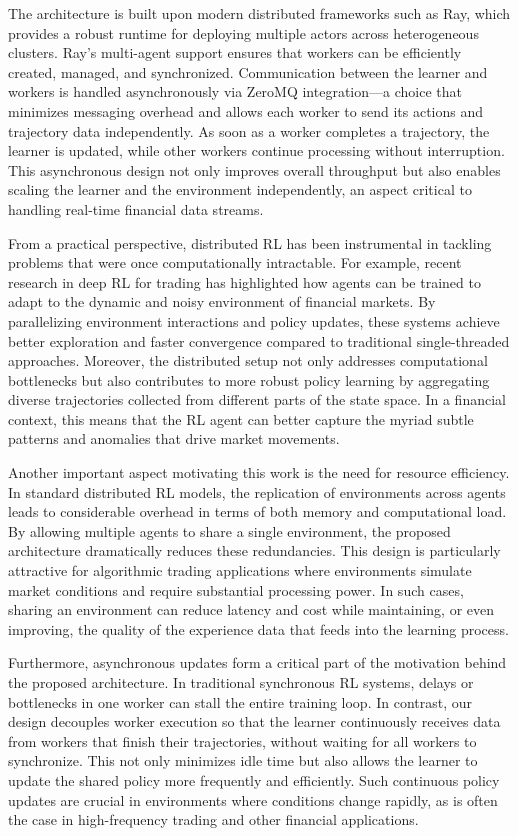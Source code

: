 The architecture is built upon modern distributed frameworks such as Ray, which provides a robust runtime
for deploying multiple actors across heterogeneous clusters.
Ray’s multi-agent support ensures that workers can be efficiently created, managed, and synchronized.
Communication between the learner and workers is handled asynchronously via ZeroMQ integration—a choice that minimizes messaging
overhead and allows each worker to send its actions and trajectory data independently.
As soon as a worker completes a trajectory, the learner is updated, while other workers continue processing without interruption.
This asynchronous design not only improves overall throughput but also enables scaling the learner and the environment independently,
an aspect critical to handling real-time financial data streams.


From a practical perspective, distributed RL has been instrumental in tackling problems that were once computationally intractable.
For example, recent research in deep RL for trading has highlighted how agents can be trained to adapt to the dynamic
and noisy environment of financial markets.
By parallelizing environment interactions and policy updates, these systems achieve better exploration
and faster convergence compared to traditional single-threaded approaches.
Moreover, the distributed setup not only addresses computational bottlenecks
but also contributes to more robust policy learning by aggregating diverse trajectories collected from different parts of the state space.
In a financial context, this means that the RL agent can better capture the myriad subtle patterns and anomalies that drive market movements.


Another important aspect motivating this work is the need for resource efficiency.
In standard distributed RL models, the replication of environments across agents leads to considerable overhead in terms of both memory and computational load.
By allowing multiple agents to share a single environment, the proposed architecture dramatically reduces these redundancies.
This design is particularly attractive for algorithmic trading applications where environments
simulate market conditions and require substantial processing power.
In such cases, sharing an environment can reduce latency and cost while maintaining, or even improving,
the quality of the experience data that feeds into the learning process.


Furthermore, asynchronous updates form a critical part of the motivation behind the proposed architecture.
In traditional synchronous RL systems, delays or bottlenecks in one worker can stall the entire training loop.
In contrast, our design decouples worker execution so that the learner continuously receives data from workers that finish their trajectories,
without waiting for all workers to synchronize.
This not only minimizes idle time but also allows the learner to update the shared policy more frequently and efficiently.
Such continuous policy updates are crucial in environments where conditions change rapidly, as is often the case in
high-frequency trading and other financial applications.


